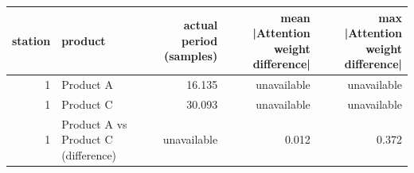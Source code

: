 \begin{tabular}{rlrrr}
\toprule
station & product & actual period (samples) & mean |Attention weight difference| & max |Attention weight difference| \\
\midrule
1 & Product A & 16.135 & unavailable & unavailable \\
1 & Product C & 30.093 & unavailable & unavailable \\
1 & Product A vs Product C (difference) & unavailable & 0.012 & 0.372 \\
\bottomrule
\end{tabular}
